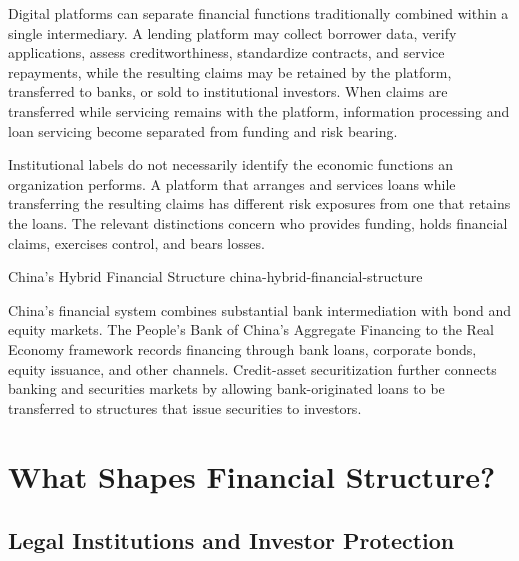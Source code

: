 Digital platforms can separate financial functions traditionally combined within a single intermediary. A lending platform may collect borrower data, verify applications, assess creditworthiness, standardize contracts, and service repayments, while the resulting claims may be retained by the platform, transferred to banks, or sold to institutional investors. When claims are transferred while servicing remains with the platform, information processing and loan servicing become separated from funding and risk bearing.

\begin{tcolorbox}[
  enhanced,
  breakable,
  colback=white,
  colframe=FinanceBlue,
  boxrule=0.7pt,
  sharp corners,
  borderline west={2.2pt}{0pt}{FinanceBlue},
  title={Financial Perspective: Financial Functions and Institutional Forms},
  coltitle=white,
  colbacktitle=FinanceBlue,
  fonttitle=\bfseries,
  before skip=1.2em,
  after skip=1.2em
]

Institutional labels do not necessarily identify the
economic functions an organization performs.
A platform that arranges and services loans while
transferring the resulting claims has different
risk exposures from one that retains the loans.
The relevant distinctions concern who provides
funding, holds financial claims, exercises control,
and bears losses.

\end{tcolorbox}

\begin{example}{China's Hybrid Financial Structure}
{china-hybrid-financial-structure}

China's financial system combines substantial bank
intermediation with bond and equity markets.
The People's Bank of China's Aggregate Financing
to the Real Economy framework records financing
through bank loans, corporate bonds, equity issuance,
and other channels. Credit-asset securitization
further connects banking and securities markets
by allowing bank-originated loans to be transferred
to structures that issue securities to investors.

\end{example}

\section{What Shapes Financial Structure?}

\subsection{Legal Institutions and Investor Protection}

